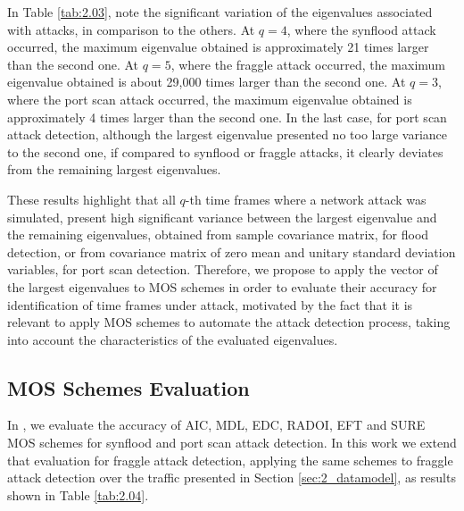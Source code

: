 In Table \ref{tab:2.03}, note the significant variation of the eigenvalues associated with attacks, in comparison to the others. At $q = 4$, where the synflood attack occurred, the maximum eigenvalue obtained is approximately 21 times larger than the second one. At $q = 5$, where the fraggle attack occurred, the maximum eigenvalue obtained is about 29,000 times larger than the second one. At $q = 3$, where the port scan attack occurred, the maximum eigenvalue obtained is approximately 4 times larger than the second one. In the last case, for port scan attack detection, although the largest eigenvalue presented no too large variance to the second one, if compared to synflood or fraggle attacks, it clearly deviates from the remaining largest eigenvalues.

These results highlight that all $q$-th time frames where a network attack was simulated, present high significant variance between the largest eigenvalue and the remaining eigenvalues, obtained from sample covariance matrix, for flood detection, or from covariance matrix of zero mean and unitary standard deviation variables, for port scan detection. Therefore, we propose to apply the vector of the largest eigenvalues to MOS schemes in order to evaluate their accuracy for identification of time frames under attack, motivated by the fact that it is relevant to apply MOS schemes to automate the attack detection process, taking into account the characteristics of the evaluated eigenvalues.

\subsection{MOS Schemes Evaluation}
\label{sec:2_MOSSchemesEvaluation}

In \cite{tenorio2013greatest}, we evaluate the accuracy of AIC, MDL, EDC, RADOI, EFT and SURE MOS schemes \cite{da2009comparison,tenorio2013greatest} for synflood and port scan attack detection. In this work we extend that evaluation for fraggle attack detection, applying the same schemes to fraggle attack detection over the traffic presented in Section \ref{sec:2_datamodel}, as results shown in Table \ref{tab:2.04}.

